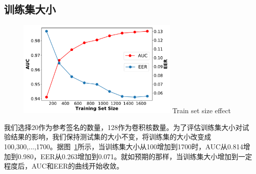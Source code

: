 \subsection{训练集大小}
\begin{figure}
  \centering
  \includegraphics[width=0.7\textwidth]{figure/train_size_auc_eer.pdf}
      {Train set size effect }
  \label{fig:train-size-effect}
\end{figure}
我们选择20作为参考签名的数量，128作为卷积核数量。为了评估训练集大小对试验结果的影响，我们保持测试集的大小不变，将训练集的大小改变成100,300,...,1700。据图~\ref{fig:train-size-effect}所示，当训练集大小从100增加到1700时，AUC从0.814增加到0.980，EER从0.263增加到0.071。就如预期的那样，当训练集大小增加到一定程度后，AUC和EER的曲线开始收敛。

